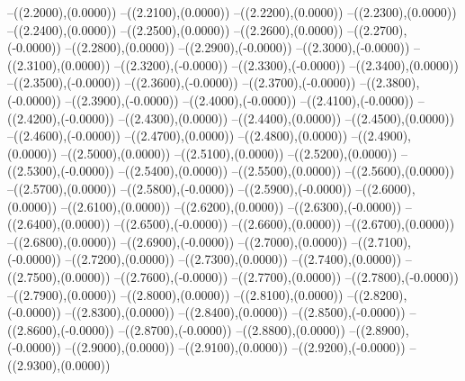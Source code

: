 {	--({\sx*(2.2000)},{\sy*(0.0000)})
	--({\sx*(2.2100)},{\sy*(0.0000)})
	--({\sx*(2.2200)},{\sy*(0.0000)})
	--({\sx*(2.2300)},{\sy*(0.0000)})
	--({\sx*(2.2400)},{\sy*(0.0000)})
	--({\sx*(2.2500)},{\sy*(0.0000)})
	--({\sx*(2.2600)},{\sy*(0.0000)})
	--({\sx*(2.2700)},{\sy*(-0.0000)})
	--({\sx*(2.2800)},{\sy*(0.0000)})
	--({\sx*(2.2900)},{\sy*(-0.0000)})
	--({\sx*(2.3000)},{\sy*(-0.0000)})
	--({\sx*(2.3100)},{\sy*(0.0000)})
	--({\sx*(2.3200)},{\sy*(-0.0000)})
	--({\sx*(2.3300)},{\sy*(-0.0000)})
	--({\sx*(2.3400)},{\sy*(0.0000)})
	--({\sx*(2.3500)},{\sy*(-0.0000)})
	--({\sx*(2.3600)},{\sy*(-0.0000)})
	--({\sx*(2.3700)},{\sy*(-0.0000)})
	--({\sx*(2.3800)},{\sy*(-0.0000)})
	--({\sx*(2.3900)},{\sy*(-0.0000)})
	--({\sx*(2.4000)},{\sy*(-0.0000)})
	--({\sx*(2.4100)},{\sy*(-0.0000)})
	--({\sx*(2.4200)},{\sy*(-0.0000)})
	--({\sx*(2.4300)},{\sy*(0.0000)})
	--({\sx*(2.4400)},{\sy*(0.0000)})
	--({\sx*(2.4500)},{\sy*(0.0000)})
	--({\sx*(2.4600)},{\sy*(-0.0000)})
	--({\sx*(2.4700)},{\sy*(0.0000)})
	--({\sx*(2.4800)},{\sy*(0.0000)})
	--({\sx*(2.4900)},{\sy*(0.0000)})
	--({\sx*(2.5000)},{\sy*(0.0000)})
	--({\sx*(2.5100)},{\sy*(0.0000)})
	--({\sx*(2.5200)},{\sy*(0.0000)})
	--({\sx*(2.5300)},{\sy*(-0.0000)})
	--({\sx*(2.5400)},{\sy*(0.0000)})
	--({\sx*(2.5500)},{\sy*(0.0000)})
	--({\sx*(2.5600)},{\sy*(0.0000)})
	--({\sx*(2.5700)},{\sy*(0.0000)})
	--({\sx*(2.5800)},{\sy*(-0.0000)})
	--({\sx*(2.5900)},{\sy*(-0.0000)})
	--({\sx*(2.6000)},{\sy*(0.0000)})
	--({\sx*(2.6100)},{\sy*(0.0000)})
	--({\sx*(2.6200)},{\sy*(0.0000)})
	--({\sx*(2.6300)},{\sy*(-0.0000)})
	--({\sx*(2.6400)},{\sy*(0.0000)})
	--({\sx*(2.6500)},{\sy*(-0.0000)})
	--({\sx*(2.6600)},{\sy*(0.0000)})
	--({\sx*(2.6700)},{\sy*(0.0000)})
	--({\sx*(2.6800)},{\sy*(0.0000)})
	--({\sx*(2.6900)},{\sy*(-0.0000)})
	--({\sx*(2.7000)},{\sy*(0.0000)})
	--({\sx*(2.7100)},{\sy*(-0.0000)})
	--({\sx*(2.7200)},{\sy*(0.0000)})
	--({\sx*(2.7300)},{\sy*(0.0000)})
	--({\sx*(2.7400)},{\sy*(0.0000)})
	--({\sx*(2.7500)},{\sy*(0.0000)})
	--({\sx*(2.7600)},{\sy*(-0.0000)})
	--({\sx*(2.7700)},{\sy*(0.0000)})
	--({\sx*(2.7800)},{\sy*(-0.0000)})
	--({\sx*(2.7900)},{\sy*(0.0000)})
	--({\sx*(2.8000)},{\sy*(0.0000)})
	--({\sx*(2.8100)},{\sy*(0.0000)})
	--({\sx*(2.8200)},{\sy*(-0.0000)})
	--({\sx*(2.8300)},{\sy*(0.0000)})
	--({\sx*(2.8400)},{\sy*(0.0000)})
	--({\sx*(2.8500)},{\sy*(-0.0000)})
	--({\sx*(2.8600)},{\sy*(-0.0000)})
	--({\sx*(2.8700)},{\sy*(-0.0000)})
	--({\sx*(2.8800)},{\sy*(0.0000)})
	--({\sx*(2.8900)},{\sy*(-0.0000)})
	--({\sx*(2.9000)},{\sy*(0.0000)})
	--({\sx*(2.9100)},{\sy*(0.0000)})
	--({\sx*(2.9200)},{\sy*(-0.0000)})
	--({\sx*(2.9300)},{\sy*(0.0000)})
}
